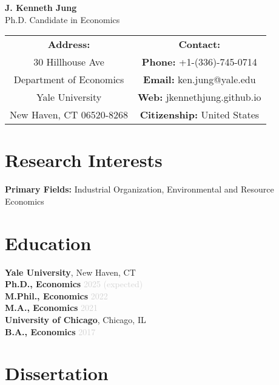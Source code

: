 \documentclass[11pt,letterpaper]{article}
\newcommand{\jobtitle}[1]{\textbf{\color{mediumgray}#1}}
\newcommand{\daterange}[1]{\textcolor{lightgray}{#1}}
\newenvironment{cvheader}
{\begin{center}\Large\sffamily}
{\end{center}}
\begin{document}
\begin{cvheader}
{\Huge\textbf{\color{darkblue}J. Kenneth Jung}}\\[8pt]
{\large\textcolor{mediumgray}{Ph.D. Candidate in Economics}}
\end{cvheader}

\vspace{12pt}

\begin{center}
\begin{tabular}{c c}
\textbf{Address:} & \textbf{Contact:} \\
30 Hillhouse Ave & \textbf{Phone:} +1-(336)-745-0714 \\
Department of Economics & \textbf{Email:} ken.jung@yale.edu \\
Yale University & \textbf{Web:} jkennethjung.github.io \\
New Haven, CT 06520-8268 & \textbf{Citizenship:} United States \\
\end{tabular}
\end{center}

\vspace{8pt}

\section*{Research Interests}
\textbf{Primary Fields:} Industrial Organization, Environmental and Resource Economics

\section*{Education}

\textbf{Yale University}, New Haven, CT \\
\jobtitle{Ph.D., Economics} \hfill \daterange{2025 (expected)} \\
\jobtitle{M.Phil., Economics} \hfill \daterange{2022} \\
\jobtitle{M.A., Economics} \hfill \daterange{2021} \\

\textbf{University of Chicago}, Chicago, IL \\
\jobtitle{B.A., Economics} \hfill \daterange{2017}

\section*{Dissertation}
\end{document}
